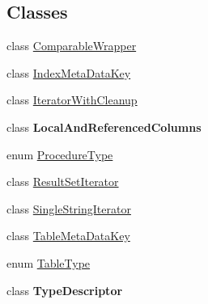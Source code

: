 \subsection*{Classes}
\begin{DoxyCompactItemize}
\item 
class \mbox{\hyperlink{classcom_1_1mysql_1_1jdbc_1_1_database_meta_data_1_1_comparable_wrapper}{Comparable\+Wrapper}}
\item 
class \mbox{\hyperlink{classcom_1_1mysql_1_1jdbc_1_1_database_meta_data_1_1_index_meta_data_key}{Index\+Meta\+Data\+Key}}
\item 
class \mbox{\hyperlink{classcom_1_1mysql_1_1jdbc_1_1_database_meta_data_1_1_iterator_with_cleanup}{Iterator\+With\+Cleanup}}
\item 
class {\bfseries Local\+And\+Referenced\+Columns}
\item 
enum \mbox{\hyperlink{enumcom_1_1mysql_1_1jdbc_1_1_database_meta_data_1_1_procedure_type}{Procedure\+Type}}
\item 
class \mbox{\hyperlink{classcom_1_1mysql_1_1jdbc_1_1_database_meta_data_1_1_result_set_iterator}{Result\+Set\+Iterator}}
\item 
class \mbox{\hyperlink{classcom_1_1mysql_1_1jdbc_1_1_database_meta_data_1_1_single_string_iterator}{Single\+String\+Iterator}}
\item 
class \mbox{\hyperlink{classcom_1_1mysql_1_1jdbc_1_1_database_meta_data_1_1_table_meta_data_key}{Table\+Meta\+Data\+Key}}
\item 
enum \mbox{\hyperlink{enumcom_1_1mysql_1_1jdbc_1_1_database_meta_data_1_1_table_type}{Table\+Type}}
\item 
class {\bfseries Type\+Descriptor}
\end{DoxyCompactItemize}
